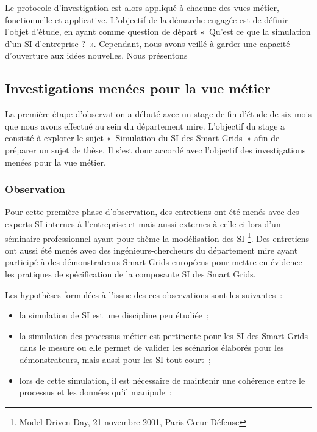 	Le protocole d'investigation est alors appliqué à chacune des vues métier, 
fonctionnelle et applicative. L'objectif de la démarche engagée est de définir 
l'objet d'étude, en ayant comme question de départ «~Qu'est ce que la simulation 
d'un SI d'entreprise ?~». Cependant, nous avons veillé à garder une capacité 
d'ouverture aux idées nouvelles. Nous présentons
	
		\subsection{Investigations menées pour la vue métier}
			La première étape d'observation a débuté avec un stage de fin d'étude de six 
mois que nous avons effectué au sein du département \gls{mire}. L'objectif du 
stage a consisté à explorer le sujet «~Simulation du SI des Smart Grids~» afin 
de préparer un sujet de thèse. Il s'est donc accordé avec l'objectif des 
investigations menées pour la vue métier.
			
			\subsubsection{Observation}
				Pour cette première phase d'observation, des entretiens ont été menés avec 
des experts SI internes à l'entreprise et mais aussi externes à celle-ci lors 
d'un séminaire professionnel ayant pour thème la modélisation des SI \footnote{Model Driven Day, 21 novembre 2001, Paris 
Cœur Défense}. Des entretiens ont aussi été menés avec des ingénieurs-chercheurs 
du département \gls{mire} ayant participé à des démonstrateurs Smart Grids 
européens pour mettre en évidence les pratiques de spécification de la 
composante SI des Smart Grids. 

				Les hypothèses formulées à l'issue des ces observations sont les suivantes~:
				\begin{itemize}
					\item la simulation de SI est une discipline peu étudiée~;
					\item la simulation des processus métier est pertinente pour les SI des 
Smart Grids dans le mesure ou elle permet de valider les scénarios élaborés pour 
les démonstrateurs, mais aussi pour les SI tout court~;
					\item lors de cette simulation, il est nécessaire de maintenir une 
cohérence entre le processus et les données qu'il manipule~;
				\end{itemize}
		

